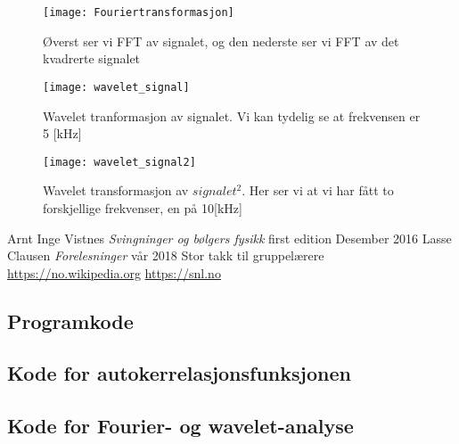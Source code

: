 \documentclass[a4paper,12pt,norsk]{article}
\begin{document}
\begin{figure}
\texttt{[image: Fouriertransformasjon]}\\
\caption[Fast Fourier transformasjon]{Øverst ser vi FFT av signalet, og den nederste ser vi FFT av det kvadrerte signalet}
\label{fft}
\end{figure}

\begin{figure}
\texttt{[image: wavelet\_signal]}\\
\caption[Wavelet av signalet]{Wavelet tranformasjon av signalet. Vi kan tydelig se at frekvensen er 5 [kHz]}
\label{wave1}
\end{figure}

\begin{figure}
\texttt{[image: wavelet\_signal2]}\\
\caption[Wavelet av $signalet^2$]{Wavelet transformasjon av $signalet^2$. Her ser vi at vi har fått to forskjellige frekvenser, en på 10[kHz] }
\label{wave2}
\end{figure}



\begin{thebibliography}{}
	Arnt Inge Vistnes
	\textit{Svingninger og bølgers fysikk}
	first edition
	Desember 2016
	Lasse Clausen
	\textit{Forelesninger}
	vår 2018
	Stor takk til gruppelærere
	\url{https://no.wikipedia.org}
	\url{https://snl.no}

\end{thebibliography}

\newpage
\begin{appendices}
\appendix
\section{Programkode}
\subsection{Kode for autokerrelasjonsfunksjonen}

\subsection{Kode for Fourier- og wavelet-analyse}

\end{appendices}
\end{document}
